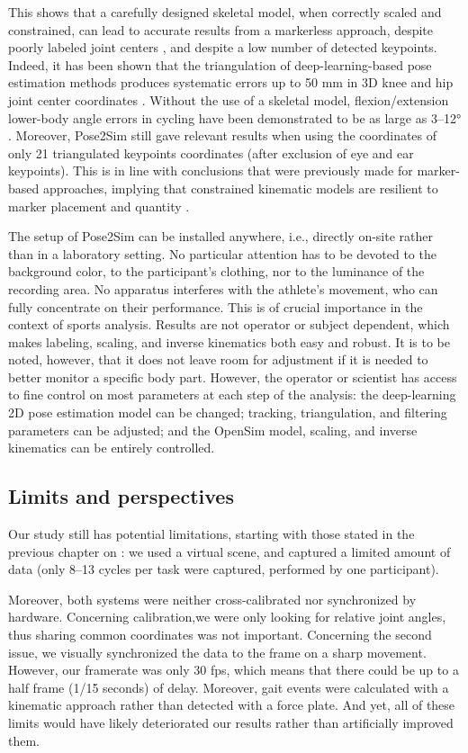This shows that a carefully designed skeletal model, when correctly scaled and constrained, can lead to accurate results from a markerless approach, despite poorly labeled joint centers \cite{Needham2021b, Wade2021}, and despite a low number of detected keypoints. Indeed, it has been shown that the triangulation of deep-learning-based pose estimation methods produces systematic errors up to 50 mm in 3D knee and hip joint center coordinates \cite{Needham2021b}. Without the use of a skeletal model, flexion/extension lower-body angle errors in cycling have been demonstrated to be as large as 3–12° \cite{Bini2021}. Moreover, Pose2Sim still gave relevant results when using the coordinates of only 21 triangulated keypoints coordinates (after exclusion of eye and ear keypoints). This is in line with conclusions that were previously made for marker-based approaches, implying that constrained kinematic models are resilient to marker placement and quantity \cite{Slater2018}.

The setup of Pose2Sim can be installed anywhere, i.e., directly on-site rather than in a laboratory setting. No particular attention has to be devoted to the background color, to the participant’s clothing, nor to the luminance of the recording area. No apparatus interferes with the athlete’s movement, who can fully concentrate on their performance. This is of crucial importance in the context of sports analysis. Results are not operator or subject dependent, which makes labeling, scaling, and inverse kinematics both easy and robust. It is to be noted, however, that it does not leave room for adjustment if it is needed to better monitor a specific body part. However, the operator or scientist has access to fine control on most parameters at each step of the analysis: the deep-learning 2D pose estimation model can be changed; tracking, triangulation, and filtering parameters can be adjusted; and the OpenSim model, scaling, and inverse kinematics can be entirely controlled.


\subsection{Limits and perspectives}

Our study still has potential limitations, starting with those stated in the previous chapter on : we used a virtual scene, and captured a limited amount of data (only 8–13 cycles per task were captured, performed by one participant). 

Moreover, both systems were neither cross-calibrated nor synchronized by hardware. Concerning calibration,we were only looking for relative joint angles, thus sharing common coordinates was not important. Concerning the second issue, we visually synchronized the data to the frame on a sharp movement. However, our framerate was only 30 fps, which means that there could be up to a half frame (1/15 seconds) of delay. Moreover, gait events were calculated with a kinematic approach \cite{Zeni2008} rather than detected with a force plate. And yet, all of these limits would have likely deteriorated our results rather than artificially improved them. 


